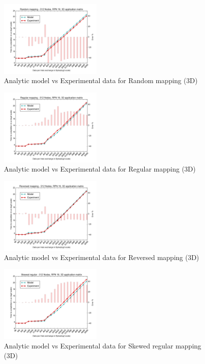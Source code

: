 \documentclass{acm_proc_article-sp}
\begin{document}
\begin{figure}
  \center
  \includegraphics[width=0.45\textwidth]{mappings/3d_random.png}
  \caption{Analytic model vs Experimental data for Random mapping (3D)}
    \label{fig:3D_random_mapping}
\end{figure}

\begin{figure}
  \center
  \includegraphics[width=0.45\textwidth]{mappings/3d_regular.png}
  \caption{Analytic model vs Experimental data for Regular mapping (3D)}
    \label{fig:3D_regular_mapping}
\end{figure}

\begin{figure}
  \center
  \includegraphics[width=0.45\textwidth]{mappings/3d_reversed.png}
  \caption{Analytic model vs Experimental data for Reversed mapping (3D)}
    \label{fig:3D_reversed_mapping}
\end{figure}

\begin{figure}
  \center
  \includegraphics[width=0.45\textwidth]{mappings/3d_skewed_regular.png}
  \caption{Analytic model vs Experimental data for Skewed regular mapping (3D)}
    \label{fig:3D_skewed_regular}
\end{figure}
\end{document}
